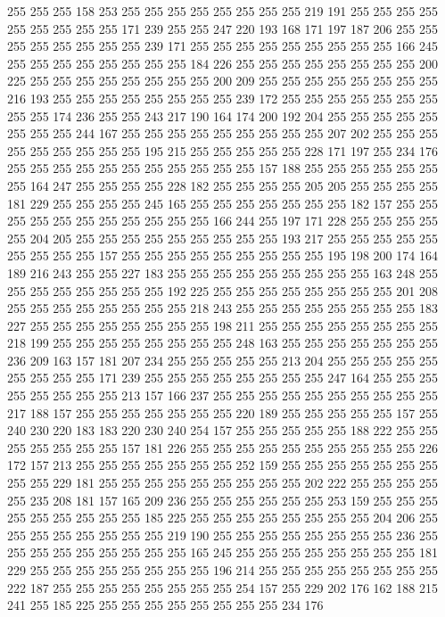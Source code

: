 255 255 255 158 253 255 255 255 255 255 255 255 255 219 191 255 255 255 255 255
255 255 255 255 171 239 255 255 247 220 193 168 171 197 187 206 255 255 255 255
255 255 255 255 239 171 255 255 255 255 255 255 255 255 255 166 245 255 255 255
255 255 255 255 255 184 226 255 255 255 255 255 255 255 255 200 225 255 255 255
255 255 255 255 255 200 209 255 255 255 255 255 255 255 255 216 193 255 255 255
255 255 255 255 255 239 172 255 255 255 255 255 255 255 255 255 174 236 255 255
243 217 190 164 174 200 192 204 255 255 255 255 255 255 255 255 244 167 255 255
255 255 255 255 255 255 255 207 202 255 255 255 255 255 255 255 255 255 195 215
255 255 255 255 255 228 171 197 255 234 176 255 255 255 255 255 255 255 255 255
255 255 157 188 255 255 255 255 255 255 255 164 247 255 255 255 255 228 182 255
255 255 255 205 205 255 255 255 255 181 229 255 255 255 255 245 165 255 255 255
255 255 255 255 182 157 255 255 255 255 255 255 255 255 255 255 255 166 244 255
197 171 228 255 255 255 255 255 204 205 255 255 255 255 255 255 255 255 255 193
217 255 255 255 255 255 255 255 255 255 157 255 255 255 255 255 255 255 255 255
195 198 200 174 164 189 216 243 255 255 227 183 255 255 255 255 255 255 255 255
255 163 248 255 255 255 255 255 255 255 255 192 225 255 255 255 255 255 255 255
255 201 208 255 255 255 255 255 255 255 255 218 243 255 255 255 255 255 255 255
255 183 227 255 255 255 255 255 255 255 255 198 211 255 255 255 255 255 255 255
255 218 199 255 255 255 255 255 255 255 255 248 163 255 255 255 255 255 255 255
236 209 163 157 181 207 234 255 255 255 255 255 213 204 255 255 255 255 255 255
255 255 255 171 239 255 255 255 255 255 255 255 255 247 164 255 255 255 255 255
255 255 255 213 157 166 237 255 255 255 255 255 255 255 255 255 255 217 188 157
255 255 255 255 255 255 255 220 189 255 255 255 255 255 157 255 240 230 220 183
183 220 230 240 254 157 255 255 255 255 255 188 222 255 255 255 255 255 255 255
157 181 226 255 255 255 255 255 255 255 255 255 255 226 172 157 213 255 255 255
255 255 255 255 252 159 255 255 255 255 255 255 255 255 255 229 181 255 255 255
255 255 255 255 255 255 202 222 255 255 255 255 255 235 208 181 157 165 209 236
255 255 255 255 255 255 253 159 255 255 255 255 255 255 255 255 255 185 225 255
255 255 255 255 255 255 255 204 206 255 255 255 255 255 255 255 255 219 190 255
255 255 255 255 255 255 255 236 255 255 255 255 255 255 255 255 255 165 245 255
255 255 255 255 255 255 255 181 229 255 255 255 255 255 255 255 255 196 214 255
255 255 255 255 255 255 255 222 187 255 255 255 255 255 255 255 255 254 157 255
229 202 176 162 188 215 241 255 185 225 255 255 255 255 255 255 255 255 234 176

